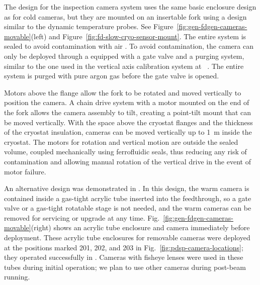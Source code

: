 The design for the inspection camera system uses the same basic
enclosure design as for cold cameras, but they are mounted on an insertable
fork  using a design similar to the dynamic temperature probes. See
Figure~\ref{fig:gen-fdgen-cameras-movable}(left) and
Figure~\ref{fig:fd-slow-cryo-sensor-mount}.  The entire system is sealed to
avoid contamination with air  . To avoid contamination, the
camera can only be deployed through a \fdth equipped with a gate
valve and a purging system, similar to the one used in the vertical axis
calibration system at \kamland~\cite{Banks:2014hra}. The entire system
is  purged with pure argon gas before the gate valve is opened.

Motors above the flange allow the fork to be rotated and moved vertically to position the camera. 
 A chain drive system with a motor
mounted on the end of the fork allows the camera assembly to tilt, 
creating a point-tilt mount that can be moved vertically.
With the space above the cryostat flanges and the
thickness of the cryostat insulation, cameras can be moved vertically up to
\SI{1}{m} inside the cryostat.
The motors for rotation and vertical motion are outside the sealed
volume, coupled mechanically using ferrofluidic seals, thus reducing any risk of
contamination and allowing manual rotation of the vertical
drive in the event of motor failure.  

An alternative design was demonstrated in . In this design, the warm camera is contained inside a gas-tight acrylic tube inserted into the feedthrough, so a gate valve or a gas-tight rotatable stage is not needed, and the warm cameras can be removed for servicing or upgrade at any time. Fig.~\ref{fig:gen-fdgen-cameras-movable}(right) shows an acrylic tube enclosure and camera immediately before deployment. These acrylic tube enclosures for removable cameras were deployed at the positions marked 201, 202, and 203 in Fig.~\ref{fig:pdsp-camera-locations}; they operated successfully in . Cameras with fisheye lenses were used in these tubes during initial operation; we plan to use other cameras during post-beam running.

